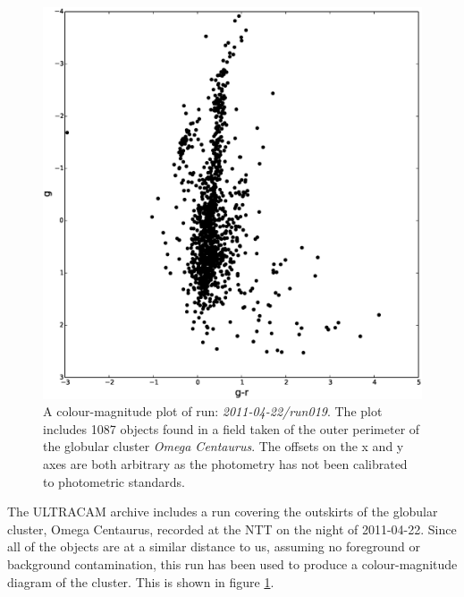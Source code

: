 \begin{figure}
\centering
\includegraphics[width=120mm]{images/2011-04-22-run019-omegacen-colourmagnitude.eps}
\caption{A colour-magnitude plot of run: \emph{2011-04-22/run019}. The plot includes 1087 objects found in a field taken of the outer perimeter of the globular cluster \emph{Omega Centaurus}. The offsets on the x and y axes are both arbitrary as the photometry has not been calibrated to photometric standards. }
\label{fig:OmegaCen-colourmagnitude}
\end{figure}

The ULTRACAM archive includes a run covering the outskirts of the globular cluster, Omega Centaurus, recorded at the NTT on the night of 2011-04-22.  Since all of the objects are at a similar distance to us, assuming no foreground or background contamination, this run has been used to produce a colour-magnitude diagram of the cluster. This is shown in figure \ref{fig:OmegaCen-colourmagnitude}. 



